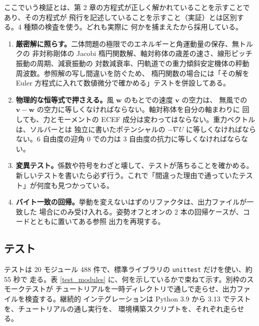 \documentclass[11pt,a4paper,dvipdfmx]{jsarticle}
\newcommand{\bv}{{\boldsymbol v}}
\begin{document}
ここでいう検証とは、第 2 章の方程式が正しく解かれていることを示すことであり、その方程式が
飛行を記述していることを示すこと（実証）とは区別する。4 種類の検査を使う。どれも実際に
何かを捕まえたから採用している。

\begin{enumerate}
\item \textbf{厳密解に照らす。}二体問題の極限でのエネルギーと角運動量の保存、無トルクの
非対称剛体の Jacobi 楕円関数解、軸対称体の歳差の速さ、線形ピッチ振動の周期、減衰振動の
対数減衰率、円軌道での重力傾斜安定機体の秤動周波数。参照解の写し間違いを防ぐため、
楕円関数の場合には「その解を Euler 方程式に入れて数値微分で確かめる」テストを併設してある。
\item \textbf{物理的な恒等式で押さえる。}風 $\boldsymbol{w}$ のもとでの速度 $\bv$ の空力は、
無風での $\bv - \boldsymbol{w}$ の空力に等しくなければならない。軸対称体を自分の軸まわりに
回しても、力とモーメントの ECEF 成分は変わってはならない。重力ベクトルは、ソルバーとは
独立に書いたポテンシャルの $-\nabla U$ に等しくなければならない。6 自由度の迎角 0 での力は
3 自由度の抗力に等しくなければならない。
\item \textbf{変異テスト。}係数や符号をわざと壊して、テストが落ちることを確かめる。
新しいテストを書いたら必ず行う。これで「間違った理由で通っていたテスト」が何度も見つかっている。
\item \textbf{バイト一致の回帰。}挙動を変えないはずのリファクタは、出力ファイルが一致した
場合にのみ受け入れる。姿勢オフとオンの 2 本の回帰ケースが、コードとともに置いてある参照
出力を再現する。
\end{enumerate}

\subsection{テスト}

テストは 20 モジュール 488 件で、標準ライブラリの \texttt{unittest} だけを使い、約 55 秒で
走る。表 \ref{test_modules} に、何を示しているかで束ねて示す。別枠のスモークテストが
チュートリアルを一時ディレクトリで通しで走らせ、出力ファイルを検査する。継続的
インテグレーションは Python 3.9 から 3.13 でテストを、チュートリアルの通し実行を、
環境構築スクリプトを、それぞれ走らせる。
\end{document}
